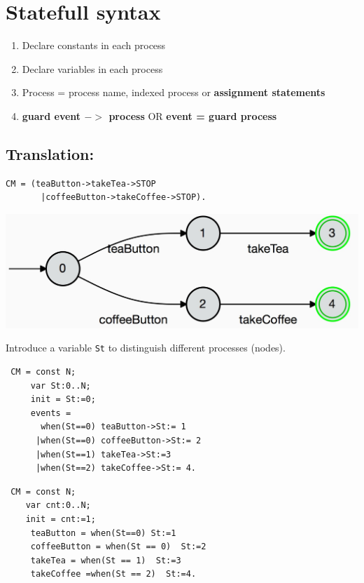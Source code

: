 \documentclass[]{article}
\begin{document}
\newpage
{\color{red}
\section{Statefull syntax}
\begin{enumerate}
\item Declare constants in each process
\item Declare variables in each process
\item Process = process name, indexed process or {\bf assignment statements}
\item {\bf guard event $->$ process} OR  {\bf event = guard  process}
\end{enumerate}

\subsection{Translation:}

\begin{center}  \begin{minipage}{0.5\textwidth}
\begin{verbatim}CM = (teaButton->takeTea->STOP
       |coffeeButton->takeCoffee->STOP).\end{verbatim}
\end{minipage}
\begin{minipage}{0.45\textwidth}\includegraphics[scale=0.15]{CM.jpg}
\end{minipage}\end{center}

Introduce a variable \verb|St| to distinguish different processes (nodes).

\noindent\begin{minipage}{0.5\textwidth}
 \begin{verbatim}
 CM = const N;
     var St:0..N;
     init = St:=0;
     events =
       when(St==0) teaButton->St:= 1
      |when(St==0) coffeeButton->St:= 2
      |when(St==1) takeTea->St:=3
      |when(St==2) takeCoffee->St:= 4.
 \end{verbatim}
 \end{minipage}
 \begin{minipage}{0.45\textwidth}
 \begin{verbatim}
 CM = const N;
    var cnt:0..N;
    init = cnt:=1;
     teaButton = when(St==0) St:=1
     coffeeButton = when(St == 0)  St:=2
     takeTea = when(St == 1)  St:=3
     takeCoffee =when(St == 2)  St:=4.
   \end{verbatim}


\end{minipage}}
\end{document}
